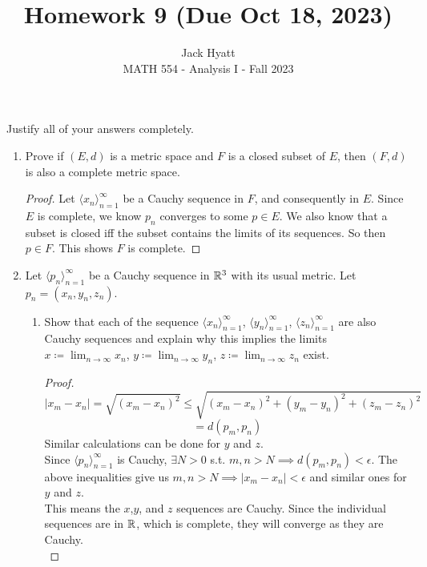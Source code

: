 \documentclass[14pt]{extarticle}
\begin{document}
	
	
	
	\title{Homework 9 (Due Oct 18, 2023)}
	\author{Jack Hyatt\\ %
		MATH 554 - Analysis I - Fall 2023} 
	
	\maketitle
	
	Justify all of your answers completely.\\
	
	
	\medskip 
	
	\begin{enumerate}
		\item Prove if $(E,d)$ is a metric space and $F$ is a closed subset of $E$, then $(F,d)$ is also a complete metric space.
		\begin{proof}
			Let $\langle x_n \rangle^\infty_{n=1}$ be a Cauchy sequence in $F$, and consequently in $E$. Since $E$ is complete, we know $p_n$ converges to some $p \in E$. We also know that a subset is closed iff the subset contains the limits of its sequences. So then $p \in F$. This shows $F$ is complete.
		\end{proof}
		
		\item Let $\langle p_n \rangle^\infty_{n=1}$ be a Cauchy sequence in $\mathbb{R}^3$ with its usual metric. Let $p_n = (x_n,y_n,z_n)$.
		\begin{enumerate}
			\item Show that each of the sequence $\langle x_n \rangle^\infty_{n=1}$, $\langle y_n \rangle^\infty_{n=1}$, $\langle z_n \rangle^\infty_{n=1}$ are also Cauchy sequences and explain why this implies the limits $x \coloneq \lim_{n\rightarrow\infty} x_n$, $y \coloneq \lim_{n\rightarrow\infty} y_n$, $z \coloneq \lim_{n\rightarrow\infty} z_n$ exist.
			\begin{proof}
				\[|x_m-x_n| = \sqrt{(x_m-x_n)^2} \leq \sqrt{(x_m-x_n)^2 + (y_m-y_n)^2 + (z_m-z_n)^2}\]\[ = d(p_m,p_n)\]
				Similar calculations can be done for $y$ and $z$.\\
				Since $\langle p_n \rangle^\infty_{n=1}$ is Cauchy, $\exists N>0$ s.t. $m,n>N \implies d(p_m,p_n)<\epsilon$. The above inequalities give us $m,n>N \implies |x_m-x_n| < \epsilon$ and similar ones for $y$ and $z$.\\
				This means the $x$,$y$, and $z$ sequences are Cauchy. Since the individual sequences are in $\mathbb{R}$, which is complete, they will converge as they are Cauchy.\\
			\end{proof}
			

\end{enumerate}
\end{enumerate}
\end{document}
